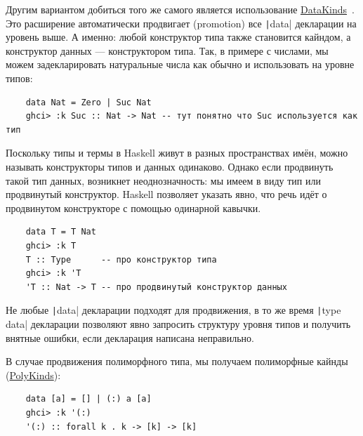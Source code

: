 Другим вариантом добиться того же самого является использование \href{https://downloads.haskell.org/ghc/latest/docs/users_guide/exts/data_kinds.html#extension-DataKinds}{DataKinds}~\cite{yorgey2012giving}.
Это расширение автоматически продвигает (promotion) все \texttt|data| декларации на уровень выше.
А именно: любой конструктор типа также становится кайндом, а конструктор данных --- конструктором типа.
Так, в примере с числами, мы можем задекларировать натуральные числа как обычно и использовать на уровне типов:
\begin{verbatim}
    data Nat = Zero | Suc Nat
    ghci> :k Suc :: Nat -> Nat -- тут понятно что Suc используется как тип
\end{verbatim}

Поскольку типы и термы в Haskell живут в разных пространствах имён, можно называть конструкторы типов и данных одинаково.
Однако если продвинуть такой тип данных, возникнет неоднозначность: мы имеем в виду тип или продвинутый конструктор.
Haskell позволяет указать явно, что речь идёт о продвинутом конструкторе с помощью одинарной кавычки.
\begin{verbatim}
    data T = T Nat
    ghci> :k T
    T :: Type      -- про конструктор типа
    ghci> :k 'T
    'T :: Nat -> T -- про продвинутый конструктор данных
\end{verbatim}

Не любые \texttt|data| декларации подходят для продвижения, в то же время \texttt|type data| декларации позволяют явно запросить структуру уровня типов и получить внятные ошибки, если декларация написана неправильно.

В случае продвижения полиморфного типа, мы получаем полиморфные кайнды (\href{https://downloads.haskell.org/ghc/latest/docs/users_guide/exts/poly_kinds.html}{PolyKinds}):
\begin{verbatim}
    data [a] = [] | (:) a [a]
    ghci> :k '(:)
    '(:) :: forall k . k -> [k] -> [k]
\end{verbatim}

